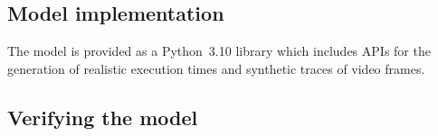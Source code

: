 



\subsection{Model implementation}

The model is provided as a Python~\num{3.10} library which includes \acp{API} for the generation of realistic execution times and synthetic traces of video frames.

\subsection{Verifying the model}